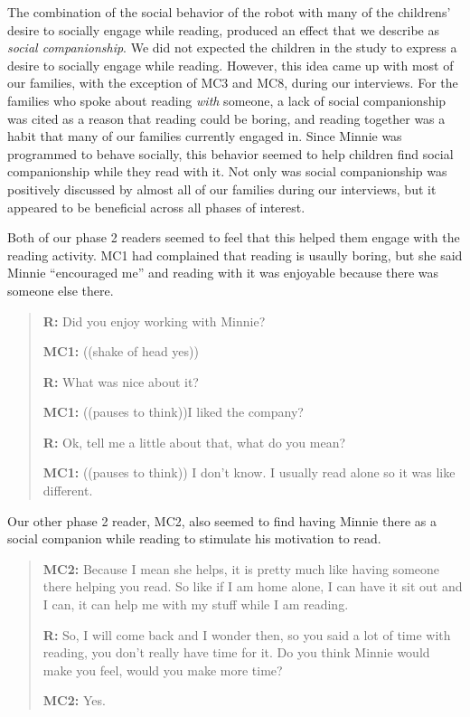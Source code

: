 \documentclass{sigchi}
\begin{document}
The combination of the social behavior of the robot with many of the childrens' desire to socially engage while reading, produced an effect that we describe as \textit{social companionship}. We did not expected the children in the study to express a desire to socially engage while reading.  However, this idea came up with most of our families, with the exception of MC3 and MC8, during our interviews.  For the families who spoke about reading \textit{with} someone, a lack of social companionship was cited as a reason that reading could be boring, and reading together was a habit that many of our families currently engaged in.  Since Minnie was programmed to behave socially, this behavior seemed to help children find social companionship while they read with it. Not only was social companionship was positively discussed by almost all of our families during our interviews, but it appeared to be beneficial across all phases of interest. 

Both of our phase 2 readers seemed to feel that this helped them engage with the reading activity.  MC1 had complained that reading is usaully boring, but she said Minnie ``encouraged me'' and reading with it was enjoyable because there was someone else there.
	
	\begin{quote}
		\textbf{R:} Did you enjoy working with Minnie?
		
		\textbf{MC1:} ((shake of head yes))
		
		\textbf{R:} What was nice about it?
		
		\textbf{MC1:} ((pauses to think))I liked the company?
		
		\textbf{R:} Ok, tell me a little about that, what do you mean?
		
		\textbf{MC1:} ((pauses to think)) I don't know. I usually read alone so it was like different.
	\end{quote}

 Our other phase 2 reader, MC2, also seemed to find having Minnie there as a social companion while reading to stimulate his motivation to read.  
  
	 \begin{quote}
	   \textbf{MC2:} Because I mean she helps, it is pretty much like having someone there helping you read. So like if I am home alone, I can have it sit out and I can, it can help me with my stuff while I am reading. 
	   
	   \textbf{R:} So, I will come back and I wonder then, so you said a lot of time with reading, you don't really have time for it. Do you think Minnie would make you feel, would you make more time? 
	   
	   \textbf{MC2:} Yes. 
 	\end{quote}
 
\end{document}
